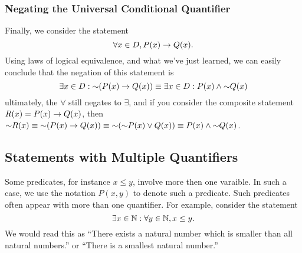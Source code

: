 \documentclass{report}
\begin{document}
\subsubsection*{Negating the Universal Conditional Quantifier}
Finally, we consider the statement
$$
	\forall x\in D, P(x)\rightarrow Q(x).
$$
Using laws of logical equivalence, and what we've just learned, we can easily conclude that the negation of this statement is
$$
	\exists x\in D: \mathord{\sim}(P(x)\rightarrow Q(x)) \equiv \exists x\in D: P(x)\land\mathord{\sim} Q(x)
$$
ultimately, the $\forall$ still negates to $\exists$, and if you consider the composite statement $R(x) = P(x)\rightarrow Q(x)$, then $\mathord{\sim} R(x)\equiv \mathord{\sim}(P(x)\rightarrow Q(x))\equiv \mathord{\sim}(\mathord{\sim} P(x)\lor Q(x)) \equiv P(x)\land\mathord{\sim} Q(x)$.


\subsection*{Statements with Multiple Quantifiers}
Some predicates, for instance $x\leq y$, involve more then one varaible. In such a case, we use the notation $P(x,y)$ to denote such a predicate. Such predicates often appear with more than one quantifier. For example, consider the statement
$$
	\exists x\in\mathbb{N}: \forall y\in\mathbb{N}, x\leq y.
$$
We would read this as ``There exists a natural number which is smaller than all natural numbers.'' or ``There is a smallest natural number.'' 
\end{document}
